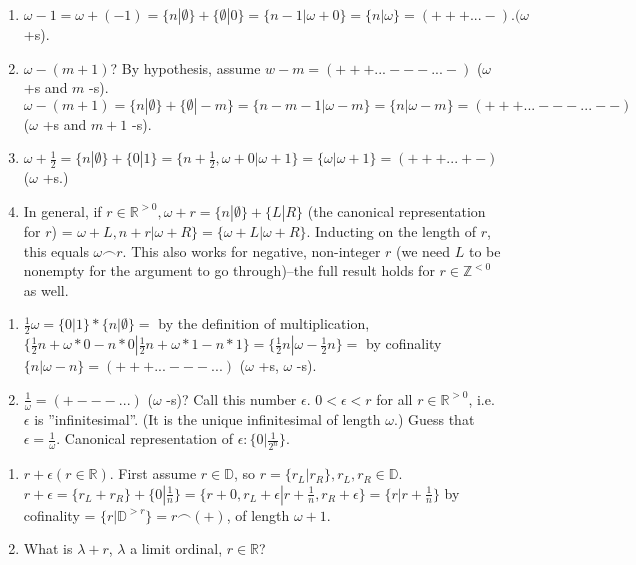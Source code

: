 \begin{enumerate}
  \item  $\omega -1 = \omega + (-1) = \{n|\emptyset \} + \{\emptyset|0\}=\{n-1|\omega + 0\}= \{n|\omega\} = (+++...-). (\omega$ +s).
  \item  $\omega - (m+1)$? By hypothesis, assume $w-m = (+++...---...-)$ ($\omega$ +s and $m$ -s). $\omega - (m+1)= \{n|\emptyset \} + \{\emptyset|-m\} = \{n-m-1|\omega -m\} = \{n|\omega-m\} = (+++...---...--)$ ($\omega$ +s and $m+1$ -s).
  \item  $\omega + \frac{1}{2} = \{n|\emptyset \} + \{0|1\} = \{n + \frac{1}{2}, \omega + 0 | \omega +1\} = \{\omega | \omega +1\}=(+++...+-)$ ($\omega$ +s.)
  \item  In general, if $r \in \mathbb{R}^{>0}, \omega + r = \{n|\emptyset \} + \{L|R\}$ (the canonical representation for $r$) = $\omega + L, n+r | \omega +R\} = \{\omega + L | \omega + R \}$. Inducting on the length of $r$, this equals $\omega \frown r$. This also works for negative, non-integer $r$ (we need $L$ to be nonempty for the argument to go through)--the full result holds for $r \in \mathbb{Z}^{<0}$ as well.
\end{enumerate}
\begin{enumerate}
  \item  $\frac{1}{2} \omega = \{0|1\}*\{n|\emptyset \}=$ by the definition of multiplication, $\{\frac{1}{2} n + \omega * 0 - n*0 | \frac{1}{2} n + \omega * 1 - n*1\}=\{\frac{1}{2} n|\omega -\frac{1}{2} n\}=$ by cofinality $\{n|\omega -n\}= (+++...---...)$ ($\omega$ +s, $\omega$ -s).
  \item  $\frac{1}{\omega}= (+---...)$ ($\omega$ -s)? Call this number $\epsilon$. $0<\epsilon <r$ for all $r \in \mathbb{R}^{>0}$, i.e. $\epsilon$ is ''infinitesimal''. (It is the unique infinitesimal of length $\omega$.) Guess that $\epsilon = \frac{1}{\omega}$. Canonical representation of $\epsilon: \{0|\frac{1}{2^n}\}$.
\end{enumerate}
\begin{enumerate}
  \item $r + \epsilon (r \in \mathbb{R})$. First assume $r \in \mathbb{D}$, so $r=\{r_L|r_R\}, r_L, r_R \in \mathbb{D}$. $r + \epsilon = \{r_L + r_R\} + \{0|\frac{1}{n}\}=\{r+0, r_L + \epsilon|r+\frac{1}{n}, r_R + \epsilon\}= \{r|r+\frac{1}{n}\}$ by cofinality = $\{r|\mathbb{D}^{>r}\}=r\frown(+)$, of length $\omega +1$.
  \item What is $\lambda +r$, $\lambda$ a limit ordinal, $r \in \mathbb{R}$?
\end{enumerate}

